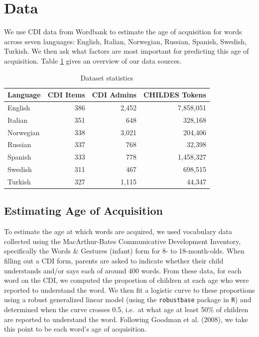 \documentclass[10pt, letterpaper]{article}
\begin{document}
\section{Data}\label{data}

We use CDI data from Wordbank to estimate the age of acquisition for
words across seven languages: English, Italian, Norwegian, Russian,
Spanish, Swedish, Turkish. We then ask what factors are most important
for predicting this age of acquisition. Table \ref{table:lang_stats}
gives an overview of our data sources.

\setlength\tabcolsep{3pt}

\begin{table}[ht]
\centering
\begin{tabular}{lrrr}
  \hline
Language & CDI Items & CDI Admins & CHILDES Tokens \\ 
  \hline
English & 386 & 2,452 & 7,858,051 \\ 
  Italian & 351 & 648 & 328,168 \\ 
  Norwegian & 338 & 3,021 & 204,406 \\ 
  Russian & 337 & 768 & 32,398 \\ 
  Spanish & 333 & 778 & 1,458,327 \\ 
  Swedish & 311 & 467 & 698,515 \\ 
  Turkish & 327 & 1,115 & 44,347 \\ 
   \hline
\end{tabular}
\caption{Dataset statistics} 
\label{table:lang_stats}
\end{table}

\subsection{Estimating Age of
Acquisition}\label{estimating-age-of-acquisition}

To estimate the age at which words are acquired, we used vocabulary data
collected using the MacArthur-Bates Communicative Development Inventory,
specifically the Words \& Gestures (infant) form for 8- to
18-month-olds. When filling out a CDI form, parents are asked to
indicate whether their child understands and/or says each of around 400
words. From these data, for each word on the CDI, we computed the
proportion of children at each age who were reported to understand the
word. We then fit a logistic curve to these proportions using a robust
generalized linear model (using the \texttt{robustbase} package in
\texttt{R}) and determined when the curve crosses 0.5, i.e.~at what age
at least 50\% of children are reported to understand the word. Following
Goodman et al. (2008), we take this point to be each word's age of
acquisition.
\end{document}
